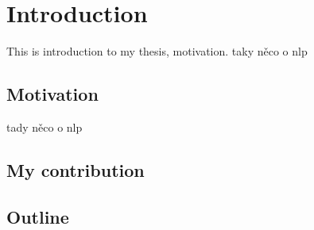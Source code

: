 \chapter{Introduction}
This is introduction to my thesis, motivation. taky něco o nlp
\section{Motivation}
tady něco o nlp
\section{My contribution}
\section{Outline}

